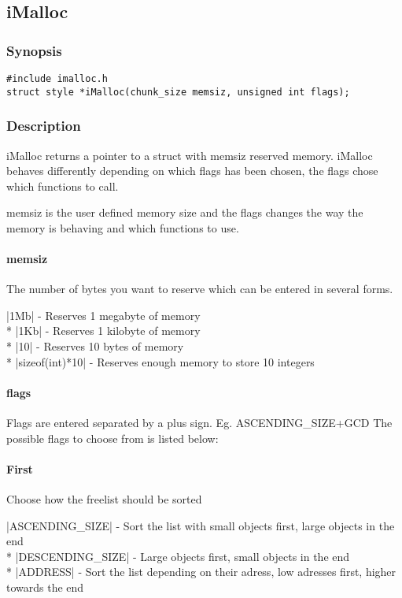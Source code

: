 
\subsection{iMalloc}

\subsubsection*{Synopsis}
\begin{verbatim}
#include imalloc.h
struct style *iMalloc(chunk_size memsiz, unsigned int flags);
\end{verbatim}

\subsubsection*{Description}

iMalloc returns a pointer to a struct with memsiz reserved memory. 
iMalloc behaves differently depending on which flags has been chosen, 
the flags chose which functions to call.

memsiz is the user defined memory size and the flags changes
the way the memory is behaving and which functions to use.

\paragraph*{memsiz} The number of bytes you want to reserve which can be entered in several forms.

|1Mb| - Reserves 1 megabyte of memory \\*
|1Kb| - Reserves 1 kilobyte of memory \\*
|10| - Reserves 10 bytes of memory \\*
|sizeof(int)*10| - Reserves enough memory to store 10 integers
\paragraph*{flags}
Flags are entered separated by a plus sign. Eg. ASCENDING\_SIZE+GCD
The possible flags to choose from is listed below:


\paragraph*{First} Choose how the freelist should be sorted

|ASCENDING\_SIZE| - Sort the list with small objects first, large objects in the end \\*
|DESCENDING\_SIZE| - Large objects first, small objects in the end \\*
|ADDRESS| - Sort the list depending on their adress, low adresses first, higher towards the end



